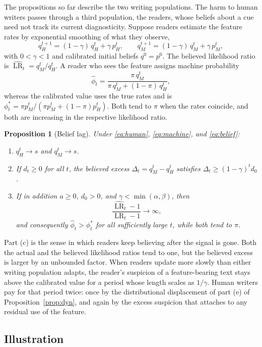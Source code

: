 \documentclass[11pt]{article}
\theoremstyle{plain}
\newtheorem{proposition}{Proposition}
\theoremstyle{definition}
\theoremstyle{remark}
\newcommand{\LR}{\operatorname{LR}}
\newcommand{\LRh}{\widehat{\operatorname{LR}}}
\begin{document}
The propositions so far describe the two writing populations. The harm to human writers passes through a third population, the readers, whose beliefs about a cue need not track its current diagnosticity. Suppose readers estimate the feature rates by exponential smoothing of what they observe,
\begin{equation}
q_H^{t+1}=(1-\gamma)\,q_H^t+\gamma\,p_H^t,
\qquad
q_M^{t+1}=(1-\gamma)\,q_M^t+\gamma\,p_M^t,
\label{eq:belief}
\end{equation}
with $0<\gamma<1$ and calibrated initial beliefs $q^0=p^0$. The believed likelihood ratio is $\LRh_t=q_M^t/q_H^t$. A reader who sees the feature assigns machine probability
\[
\hat\phi_t=\frac{\pi\,q_M^t}{\pi\,q_M^t+(1-\pi)\,q_H^t},
\]
whereas the calibrated value uses the true rates and is $\phi^\ast_t=\pi p_M^t/(\pi p_M^t+(1-\pi)p_H^t)$. Both tend to $\pi$ when the rates coincide, and both are increasing in the respective likelihood ratio.

\begin{proposition}[Belief lag]\label{prop:belief}
Under \eqref{eq:human}, \eqref{eq:machine}, and \eqref{eq:belief}:
\begin{enumerate}[label=(\alph*),leftmargin=2.2em]
\item $q_H^t\to s$ and $q_M^t\to s$.
\item If $d_t\ge0$ for all $t$, the believed excess $\Delta_t=q_M^t-q_H^t$ satisfies $\Delta_t\ge(1-\gamma)^t d_0$.
\item If in addition $a\ge0$, $d_0>0$, and $\gamma<\min(\alpha,\beta)$, then
\[
\frac{\LRh_t-1}{\LR_t-1}\longrightarrow\infty,
\]
and consequently $\hat\phi_t>\phi^\ast_t$ for all sufficiently large $t$, while both tend to $\pi$.
\end{enumerate}
\end{proposition}

Part (c) is the sense in which readers keep believing after the signal is gone. Both the actual and the believed likelihood ratios tend to one, but the believed excess is larger by an unbounded factor. When readers update more slowly than either writing population adapts, the reader's suspicion of a feature-bearing text stays above the calibrated value for a period whose length scales as $1/\gamma$. Human writers pay for that period twice: once by the distributional displacement of part (e) of Proposition~\ref{prop:dyn}, and again by the excess suspicion that attaches to any residual use of the feature.

\subsection{Illustration}
\end{document}
